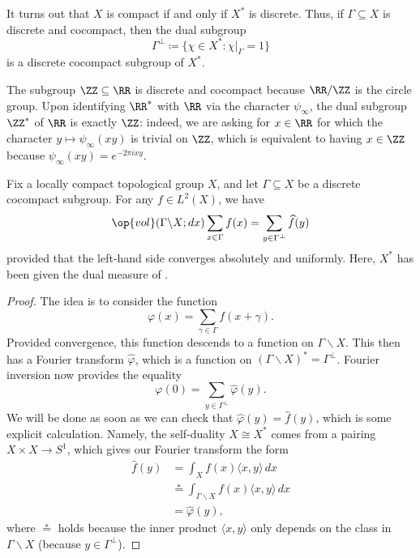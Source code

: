 \documentclass[../notes.tex]{subfiles}
\begin{document}
\begin{remark}
	It turns out that $X$ is compact if and only if $X^*$ is discrete. Thus, if $\Gamma\subseteq X$ is discrete and cocompact, then the dual subgroup
	\[\Gamma^\perp\coloneqq\{\chi\in X^*:\chi|_\Gamma=1\}\]
	is a discrete cocompact subgroup of $X^*$.
\end{remark}
\begin{example}
	The subgroup $\ZZ\subseteq\RR$ is discrete and cocompact because $\RR/\ZZ$ is the circle group. Upon identifying $\RR^*$ with $\RR$ via the character $\psi_\infty$, the dual subgroup $\ZZ^*$ of $\RR$ is exactly $\ZZ$: indeed, we are asking for $x\in\RR$ for which the character $y\mapsto\psi_\infty(xy)$ is trivial on $\ZZ$, which is equivalent to having $x\in\ZZ$ because $\psi_\infty(xy)=e^{-2\pi ixy}$.
\end{example}
\begin{theorem}
	Fix a locally compact topological group $X$, and let $\Gamma\subseteq X$ be a discrete cocompact subgroup. For any $f\in L^2(X)$, we have
	\[\op{vol}(\Gamma\backslash X;dx)\sum_{x\in\Gamma}f(x)=\sum_{y\in\Gamma^\perp}\widehat f(y)\]
	provided that the left-hand side converges absolutely and uniformly. Here, $X^*$ has been given the dual measure of .
\end{theorem}
\begin{proof}
	The idea is to consider the function
	\[\varphi(x)=\sum_{\gamma\in\Gamma}f(x+\gamma).\]
	Provided convergence, this function descends to a function on $\Gamma\backslash X$. This then has a Fourier transform $\widehat\varphi$, which is a function on $(\Gamma\backslash X)^*=\Gamma^\perp$. Fourier inversion now provides the equality
	\[\varphi(0)=\sum_{y\in\Gamma^\perp}\widehat\varphi(y).\]
	We will be done as soon as we can check that $\widehat\varphi(y)=\widehat f(y)$, which is some explicit calculation. Namely, the self-duality $X\cong X^*$ comes from a pairing $X\times X\to S^1$, which gives our Fourier transform the form
	\begin{align*}
		\widehat f(y) &= \int_Xf(x)\langle x,y\rangle\,dx \\
		&\stackrel*= \int_{\Gamma\backslash X}f(x)\langle x,y\rangle\,dx \\
		&= \widehat\varphi(y),
	\end{align*}
	where $\stackrel*=$ holds because the inner product $\langle x,y\rangle$ only depends on the class in $\Gamma\backslash X$ (because $y\in\Gamma^\perp$).
\end{proof}
\end{document}
